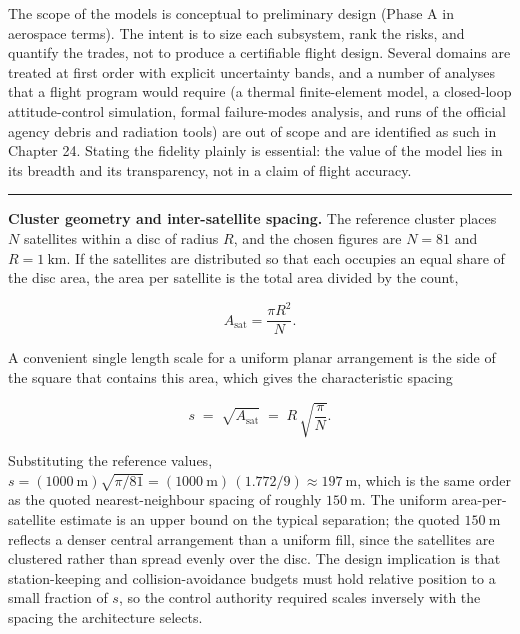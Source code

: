 \documentclass[
  11pt,
  openany,
  oneside]{book}
\begin{document}
The scope of the models is conceptual to preliminary design (Phase A in
aerospace terms). The intent is to size each subsystem, rank the risks,
and quantify the trades, not to produce a certifiable flight design.
Several domains are treated at first order with explicit uncertainty
bands, and a number of analyses that a flight program would require (a
thermal finite-element model, a closed-loop attitude-control simulation,
formal failure-modes analysis, and runs of the official agency debris
and radiation tools) are out of scope and are identified as such in
Chapter 24. Stating the fidelity plainly is essential: the value of the
model lies in its breadth and its transparency, not in a claim of flight
accuracy.

\begin{center}\rule{0.5\linewidth}{0.5pt}\end{center}

\textbf{Cluster geometry and inter-satellite spacing.} The reference
cluster places \(N\) satellites within a disc of radius \(R\), and the
chosen figures are \(N = 81\) and \(R = 1\ \mathrm{km}\). If the
satellites are distributed so that each occupies an equal share of the
disc area, the area per satellite is the total area divided by the
count,

\begin{equation}
A_{\mathrm{sat}} = \frac{\pi R^{2}}{N}. \tag{3.1}
\end{equation}

A convenient single length scale for a uniform planar arrangement is the
side of the square that contains this area, which gives the
characteristic spacing

\begin{equation}
s \;=\; \sqrt{A_{\mathrm{sat}}} \;=\; R\,\sqrt{\frac{\pi}{N}}. \tag{3.2}
\end{equation}

Substituting the reference values,
\(s = (1000\ \mathrm{m})\sqrt{\pi/81} = (1000\ \mathrm{m})\,(1.772/9) \approx 197\ \mathrm{m}\),
which is the same order as the quoted nearest-neighbour spacing of
roughly \(150\ \mathrm{m}\). The uniform area-per-satellite estimate is
an upper bound on the typical separation; the quoted \(150\ \mathrm{m}\)
reflects a denser central arrangement than a uniform fill, since the
satellites are clustered rather than spread evenly over the disc. The
design implication is that station-keeping and collision-avoidance
budgets must hold relative position to a small fraction of \(s\), so the
control authority required scales inversely with the spacing the
architecture selects.
\end{document}
